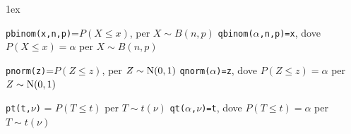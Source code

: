 \documentclass[11pt,openany]{book}
\newcommand{\mylabel}[1]{{\footnotesize\textsf{#1}}\hfill}
\renewenvironment{itemize}
  {\begin{list}{$\triangleright$}{%
   \setlength{\parskip}{0mm}
   \setlength{\topsep}{.2\baselineskip}
   \setlength{\rightmargin}{0mm}
   \setlength{\listparindent}{0mm}
   \setlength{\itemindent}{0mm}
   \setlength{\labelwidth}{3ex}
   \setlength{\itemsep}{.4\baselineskip}
   \setlength{\parsep}{0mm}
   \setlength{\partopsep}{0mm}
   \setlength{\labelsep}{1ex}
   \setlength{\leftmargin}{\labelwidth+\labelsep}
   \let\makelabel\mylabel}}{%
   \end{list}\vspace*{-1.3mm}}
\begin{document}
\vfill
\parskip1ex
{\hrulefill\scriptsize

{\tt pbinom(x,n,p)}=$P(X\le x)$, per $X\sim B(n,p)$
\hfill 
{\tt qbinom($\alpha$,n,p)=x},  dove $P(X\le x)=\alpha$ per $X\sim B(n,p)$

{\tt pnorm(z)}=$P(Z\le z)$, per $Z\sim {\rm N}(0,1)$
\hfill 
{\tt qnorm($\alpha$)=z},  dove $P(Z\le z)=\alpha$ per $Z\sim {\rm N}(0,1)$

{\tt pt(t,$\nu$)} = $P(T\le t)$ per $T\sim t(\nu)$
\hfill
{\tt qt($\alpha$,$\nu$)=t}, dove $P(T\le t)=\alpha$ per $T\sim t(\nu)$

}

\end{document}
